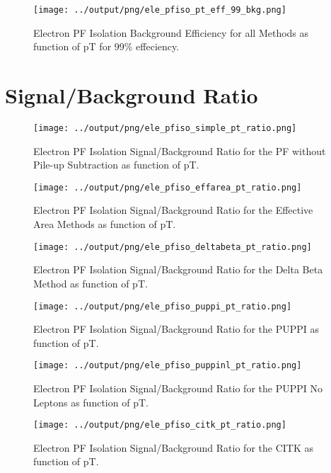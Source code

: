 \documentclass[11pt]{book}
\begin{document}
\begin{figure}[htb]
\centering
\texttt{[image: ../output/png/ele\_pfiso\_pt\_eff\_99\_bkg.png]}
\caption{Electron PF Isolation Background Efficiency for all Methods as function of pT for 99\% effeciency.}
\label{fig:ele_pfiso_pt_eff_99_bkg}
\end{figure}
\clearpage


\section{Signal/Background Ratio}
\begin{figure}[htb]
\centering
\texttt{[image: ../output/png/ele\_pfiso\_simple\_pt\_ratio.png]}
\caption{Electron PF Isolation Signal/Background Ratio for the PF without Pile-up Subtraction as function of pT.}
\label{fig:ele_pfiso_pt_ratio_simple}
\end{figure}

\begin{figure}[htb]
\centering
\texttt{[image: ../output/png/ele\_pfiso\_effarea\_pt\_ratio.png]}
\caption{Electron PF Isolation Signal/Background Ratio for the Effective Area Methods as function of pT.}
\label{fig:ele_pfiso_pt_ratio_effarea}
\end{figure}

\begin{figure}[htb]
\centering
\texttt{[image: ../output/png/ele\_pfiso\_deltabeta\_pt\_ratio.png]}
\caption{Electron PF Isolation Signal/Background Ratio for the Delta Beta Method as function of pT.}
\label{fig:ele_pfiso_pt_ratio_deltabeta}
\end{figure}

\begin{figure}[htb]
\centering
\texttt{[image: ../output/png/ele\_pfiso\_puppi\_pt\_ratio.png]}
\caption{Electron PF Isolation Signal/Background Ratio for the PUPPI as function of pT.}
\label{fig:ele_pfiso_pt_ratio_puppi}
\end{figure}

\begin{figure}[htb]
\centering
\texttt{[image: ../output/png/ele\_pfiso\_puppinl\_pt\_ratio.png]}
\caption{Electron PF Isolation Signal/Background Ratio for the PUPPI No Leptons as function of pT.}
\label{fig:ele_pfiso_pt_ratio_puppinl}
\end{figure}

\begin{figure}[htb]
\centering
\texttt{[image: ../output/png/ele\_pfiso\_citk\_pt\_ratio.png]}
\caption{Electron PF Isolation Signal/Background Ratio for the CITK as function of pT.}
\label{fig:ele_pfiso_pt_ratio_citk}
\end{figure}
\end{document}
